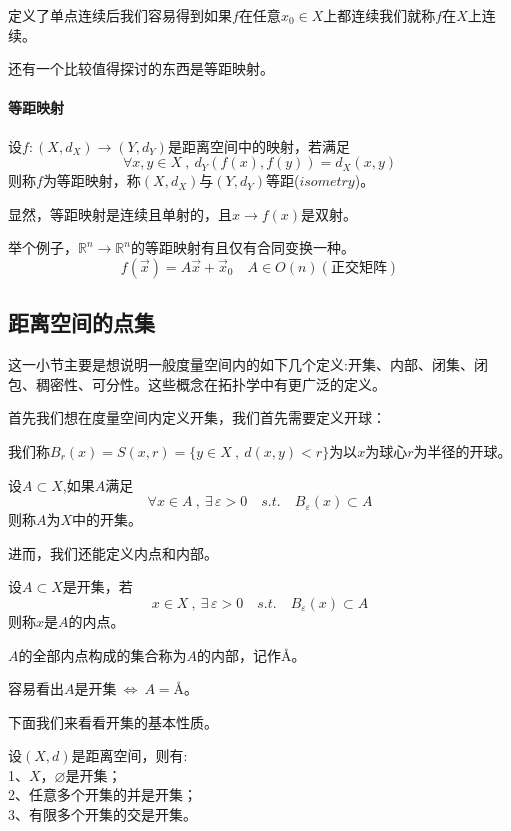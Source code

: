 定义了单点连续后我们容易得到如果$f$在任意$x_0 \in X$上都连续我们就称$f$在$X$上连续。

还有一个比较值得探讨的东西是等距映射。
\paragraph*{等距映射} \quad 设$f:(X,d_X) \rightarrow (Y,d_Y)$是距离空间中的映射，若满足
\[\forall x,y \in X \ , \ d_Y(f(x),f(y))=d_X(x,y)\]
则称$f$为等距映射，称$(X,d_X)$与$(Y,d_Y)$等距($isometry$)。

显然，等距映射是连续且单射的，且$x \rightarrow f(x)$是双射。

举个例子，$\mathbb{R}^n \rightarrow \mathbb{R}^n$的等距映射有且仅有合同变换一种。
\[f(\overrightarrow{x})=A\overrightarrow{x}+\overrightarrow{x}_0 \quad A \in O(n)(\text{正交矩阵})\]

\subsection{距离空间的点集} \label{pointset}
这一小节主要是想说明一般度量空间内的如下几个定义:开集、内部、闭集、闭包、稠密性、可分性。这些概念在拓扑学中有更广泛的定义。

首先我们想在度量空间内定义开集，我们首先需要定义开球：
\begin{definition}[开球]
    我们称$B_r(x)=S(x,r)=\{y \in X \ , \ d(x,y)<r\}$为以$x$为球心$r$为半径的开球。
\end{definition}
\begin{definition}[开集]
    设$A \subset X$,如果$A$满足
    \[\forall x \in A \ , \ \exists \, \varepsilon>0 \quad s.t. \quad B_{\varepsilon}(x) \subset A\]
    则称$A$为$X$中的开集。
\end{definition}
进而，我们还能定义内点和内部。
\begin{definition}[内点]
    设$A \subset X$是开集，若
    \[x \in X \ , \ \exists \, \varepsilon>0 \quad s.t. \quad B_{\varepsilon}(x) \subset A\]
    则称$x$是$A$的内点。
\end{definition}
\begin{definition}[内部]
    $A$的全部内点构成的集合称为$A$的内部，记作\AA。
\end{definition}
容易看出$A$是开集$ \ \Leftrightarrow \ A=$\AA。

下面我们来看看开集的基本性质。
\begin{theorem}
    设$(X,d)$是距离空间，则有:\\
    1、$X$，$\varnothing$是开集；\\
    2、任意多个开集的并是开集；\\
    3、有限多个开集的交是开集。
\end{theorem}

